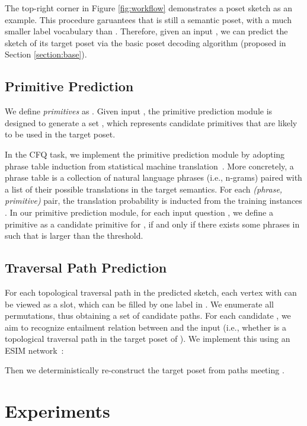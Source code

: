 \documentclass{article}
\begin{document}
The top-right corner in Figure \ref{fig:workflow} demonstrates a poset sketch as an example.
This procedure garuantees that  is still a semantic poset, with a much smaller label vocabulary  than .
Therefore, given an input , we can predict the sketch of its target poset via the basic poset decoding algorithm (proposed in Section \ref{section:base}).

\subsection{Primitive Prediction}
\label{sec:primitive_prediction}
We define \emph{primitives} as .
Given input , the primitive prediction module is designed to generate a set , which represents candidate primitives that are likely to be used in the target poset.

In the CFQ task, we implement the primitive prediction module by adopting phrase table induction from statistical machine translation~\citep{koehn2009statistical}.
More concretely, a phrase table is a collection of natural language phrases (i.e., n-grams) paired with a list of their possible translations in the target semantics.
For each \emph{(phrase, primitive)} pair, the translation probability  is inducted from the training instances .
In our primitive prediction module, for each input question , we define a primitive as a candidate primitive for , if and only if there exists some phrases in  such that  is larger than the threshold.

\subsection{Traversal Path Prediction}

For each topological traversal path in the predicted sketch, each vertex  with  can be viewed as a slot, which can be filled by one label in .
We enumerate all permutations, thus obtaining a set of candidate paths.
For each candidate , we aim to recognize entailment relation between  and the input  (i.e., whether  is a topological traversal path in the target poset of ).
We implement this using an ESIM network~\citep{chen2016enhanced}:



Then we deterministically re-construct the target poset from paths meeting .







\section{Experiments}
\end{document}
